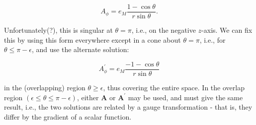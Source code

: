 \documentclass[12pt]{article}
\begin{document}
$$
A_{\phi}=e_{M} \frac{1-\cos \theta}{r \sin \theta} .
$$

Unfortunately(?), this is singular at $\theta=\pi$, i.e., on the negative $z$-axis. We can fix this by using this form everywhere except in a cone about $\theta=\pi$, i.e., for $\theta \leq \pi-\epsilon$, and use the alternate solution:

$$
A_{\phi}^{\prime}=e_{M} \frac{-1-\cos \theta}{r \sin \theta}
$$

in the (overlapping) region $\theta \geq \epsilon$, thus covering the entire space. In the overlap region $(\epsilon \leq \theta \leq \pi-\epsilon)$, either $\boldsymbol{A}$ or $\boldsymbol{A}^{\prime}$ may be used, and must give the same result, i.e., the two solutions are related by a gauge transformation - that is, they differ by the gradient of a scalar function.
\end{document}
